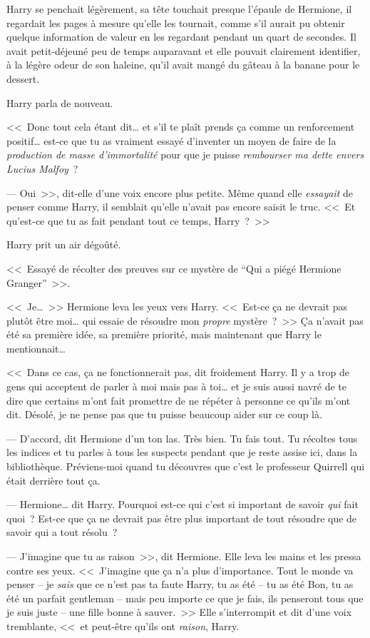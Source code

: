 Harry se penchait légèrement, sa tête touchait presque l'épaule de Hermione, il regardait les pages à mesure qu'elle les tournait, comme s'il aurait pu obtenir quelque information de valeur en les regardant pendant un quart de secondes. Il avait petit-déjeuné peu de temps auparavant et elle pouvait clairement identifier, à la légère odeur de son haleine, qu'il avait mangé du gâteau à la banane pour le dessert.

Harry parla de nouveau.

<<~Donc tout cela étant dit… et s'il te plaît prends ça comme un renforcement positif… est-ce que tu as vraiment essayé d'inventer un moyen de faire de la \emph{production de masse d'immortalité} pour que je puisse \emph{rembourser ma dette envers Lucius Malfoy}~?

--- Oui~>>, dit-elle d'une voix encore plus petite. Même quand elle \emph{essayait} de penser comme Harry, il semblait qu'elle n'avait pas encore saisit le truc. <<~Et qu'est-ce que tu as fait pendant tout ce temps, Harry~?~>>

Harry prit un air dégoûté.

<<~Essayé de récolter des preuves sur ce mystère de “Qui a piégé Hermione Granger”~>>.

<<~Je…~>> Hermione leva les yeux vers Harry. <<~Est-ce ça ne devrait pas plutôt être moi… qui essaie de résoudre mon \emph{propre} mystère~?~>> Ça n'avait pas été sa première idée, sa première priorité, mais maintenant que Harry le mentionnait…

<<~Dans ce cas, ça ne fonctionnerait pas, dit froidement Harry. Il y a trop de gens qui acceptent de parler à moi mais pas à toi… et je suis aussi navré de te dire que certains m'ont fait promettre de ne répéter à personne ce qu'ils m'ont dit. Désolé, je ne pense pas que tu puisse beaucoup aider sur ce coup là.

--- D'accord, dit Hermione d'un ton las. Très bien. Tu fais tout. Tu récoltes tous les indices et tu parles à tous les suspects pendant que je reste assise ici, dans la bibliothèque. Préviens-moi quand tu découvres que c'est le professeur Quirrell qui était derrière tout ça.

--- Hermione… dit Harry. Pourquoi est-ce qui c'est si important de savoir \emph{qui} fait quoi~? Est-ce que ça ne devrait pas être plus important de tout résoudre que de savoir qui a tout résolu~?

--- J'imagine que tu as raison~>>, dit Hermione. Elle leva les mains et les pressa contre ses yeux. <<~J'imagine que ça n'a plus d'importance. Tout le monde va penser -- je \emph{sais} que ce n'est pas ta faute Harry, tu as été -- tu as été Bon, tu as été un parfait gentleman -- mais peu importe ce que je fais, ils penseront tous que je suis juste -- une fille bonne à sauver.~>> Elle s'interrompit et dit d'une voix tremblante, <<~et peut-être qu'ils ont \emph{raison}, Harry.

